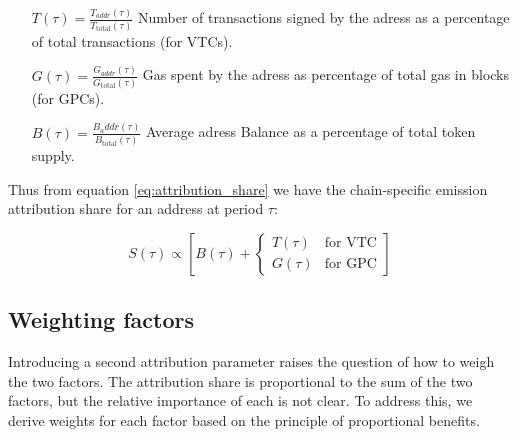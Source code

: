 \documentclass[11pt]{report}
\begin{document}
\begin{description}[leftmargin=!, labelwidth=\widthof{\bfseries Passive Behavior}]

    \item[Interactive Behavior $(I)$] \hfill
        \begin{itemize}[labelwidth=4cm, align=left, labelsep=0pt]
            \item[\( T(\tau) = \frac{T_{addr}(\tau)}{T_{\text{total}}(\tau)} \)]
                Number of transactions signed by the adress as a percentage of total transactions (for VTCs).

            \item[\(G(\tau) = \frac{G_{addr}(\tau)}{G_{\text{total}}(\tau)} \)]
                Gas spent by the adress as percentage of total gas in blocks (for GPCs).
        \end{itemize}

    \item[Passive Behavior $P$] \hfil
        \begin{itemize}[labelwidth=4cm, align=left, labelsep=0pt]
            \item[\(B(\tau) = \frac{B_addr(\tau)}{B_{\text{total}}(\tau)} \)]
                Average adress Balance as a percentage of total token supply.
        \end{itemize}

\end{description}
\parsep 5pt
Thus from equation \eqref{eq:attribution_share} we have the chain-specific emission attribution share for an address at period $\tau$:


\begin{equation}
    S(\tau) \propto \left[B(\tau) + \begin{cases}
            T(\tau) & \text{for VTC} \\
            G(\tau) & \text{for GPC}
        \end{cases}\right]
    \label{eq:attribution_share_chain_type}
\end{equation}

\subsection{Weighting factors}

Introducing a second attribution parameter raises the question of how to weigh the two factors. The attribution share is proportional to the sum of the two factors, but the relative importance of each is not clear. To address this, we derive weights for each factor based on the principle of proportional benefits.
\end{document}
